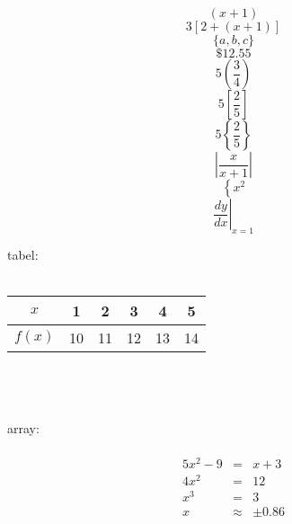 \documentclass[11pt]{article}
\begin{document}
$$(x+1)$$
$$3[2+(x+1)]$$
$$\{a,b,c\}$$
$$\$12.55$$
$$5\left(\frac{3}{4}\right)$$
$$5\left[\frac{2}{5}\right]$$
$$5\left\{\frac{2}{5}\right\}$$
$$\left|\frac{x}{x+1}\right|$$
$$\left\{x^2\right.$$
$$\left.\frac{dy}{dx} \right|_{x=1}$$

tabel:
\\\\
\begin{tabular}{|c|c|c|c|c|c|}
\hline
$x$ & 1 & 2 & 3 & 4 & 5 \\ \hline
$f\left(x\right)$ & 10 & 11 & 12 & 13 & 14 \\
\hline
\end{tabular}
\\\\\\
array:\\\\
\begin{eqnarray*}
5x^2-9&=&x+3\\
4x^2&=&12\\
x^3&=&3\\
x&\approx&\pm0.86
\end{eqnarray*}
\end{document}
